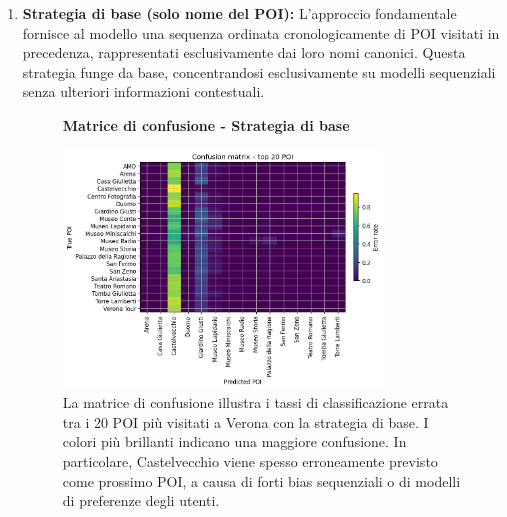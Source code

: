 \documentclass[12pt,a4paper]{article}
\begin{document}
\begin{enumerate}

\item \textbf{Strategia di base (solo nome del POI):} L'approccio fondamentale fornisce al modello una sequenza ordinata cronologicamente di POI visitati in precedenza, rappresentati esclusivamente dai loro nomi canonici. Questa strategia funge da base, concentrandosi esclusivamente su modelli sequenziali senza ulteriori informazioni contestuali.
\begin{figure}[H]
\centering
\textbf{Matrice di confusione - Strategia di base}\par
\vspace{0.5em}
\includegraphics[width=0.8\textwidth]{../../img/no_SPACE-GEO_n-1_come_current_POI/confusion_matrix.png}
\caption{La matrice di confusione illustra i tassi di classificazione errata tra i 20 POI più visitati a Verona con la strategia di base. I colori più brillanti indicano una maggiore confusione. In particolare, Castelvecchio viene spesso erroneamente previsto come prossimo POI, a causa di forti bias sequenziali o di modelli di preferenze degli utenti.
}
\label{fig:baseline_confusion}
\end{figure}


\end{enumerate}
\end{document}
